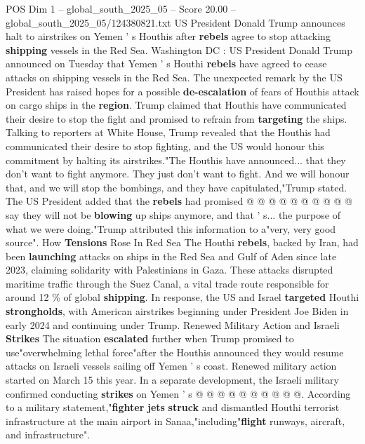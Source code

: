 \begin{textsample}{POS Dim 1 – global\_south\_2025\_05 – Score 20.00 – global\_south\_2025\_05/124380821.txt}  \label{ex:f1_pos_283}
US President Donald Trump announces halt to airstrikes on Yemen ' s Houthis after \textbf{rebels} agree to stop attacking \textbf{shipping} vessels in the Red Sea.
Washington DC : US President Donald Trump announced on Tuesday that Yemen ' s Houthi \textbf{rebels} have agreed to cease attacks on shipping vessels in the Red Sea.
The unexpected remark by the US President has raised hopes for a possible \textbf{de-escalation} of fears of Houthis attack on cargo ships in the \textbf{region}.
Trump claimed that Houthis have communicated their desire to stop the fight and promised to refrain from \textbf{targeting} the ships.
Talking to reporters at White House, Trump revealed that the Houthis had communicated their desire to stop fighting, and the US would honour this commitment by halting its airstrikes."The Houthis have announced... that they don't want to fight anymore.
They just don't want to fight.
And we will honour that, and we will stop the bombings, and they have capitulated,"Trump stated.
The US President added that the \textbf{rebels} had promised @ @ @ @ @ @ @ @ @ @ say they will not be \textbf{blowing} up ships anymore, and that ' s... the purpose of what we were doing."Trump attributed this information to a"very, very good source".
How \textbf{Tensions} Rose In Red Sea The Houthi \textbf{rebels}, backed by Iran, had been \textbf{launching} attacks on ships in the Red Sea and Gulf of Aden since late 2023, claiming solidarity with Palestinians in Gaza.
These attacks disrupted maritime traffic through the Suez Canal, a vital trade route responsible for around 12 \% of global \textbf{shipping}.
In response, the US and Israel \textbf{targeted} Houthi \textbf{strongholds}, with American airstrikes beginning under President Joe Biden in early 2024 and continuing under Trump.
Renewed Military Action and Israeli \textbf{Strikes} The situation \textbf{escalated} further when Trump promised to use"overwhelming lethal force"after the Houthis announced they would resume attacks on Israeli vessels sailing off Yemen ' s coast.
Renewed military action started on March 15 this year.
In a separate development, the Israeli military confirmed conducting \textbf{strikes} on Yemen ' s @ @ @ @ @ @ @ @ @ @.
According to a military statement,"\textbf{fighter} \textbf{jets} \textbf{struck} and dismantled Houthi terrorist infrastructure at the main airport in Sanaa,"including"\textbf{flight} runways, aircraft, and infrastructure".

\end{textsample}
